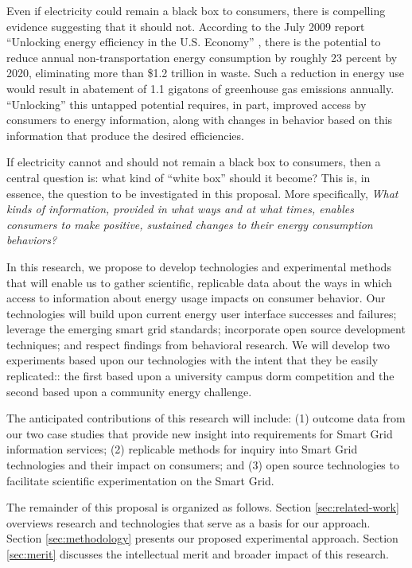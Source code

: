 Even if electricity could remain a black box to consumers, there is
compelling evidence suggesting that it should not.  According to the July 2009
report ``Unlocking energy efficiency in the U.S. Economy'' \cite{Granade09}, there is the
potential to reduce annual non-transportation energy consumption by roughly
23 percent by 2020, eliminating more than \$1.2 trillion in waste.  Such a
reduction in energy use would result in abatement of 1.1 gigatons of
greenhouse gas emissions annually. ``Unlocking'' this untapped potential
requires, in part, improved access by consumers to energy information,
along with changes in behavior based on this information that produce the
desired efficiencies.

If electricity cannot and should not remain a black box to consumers, then a
central question is: what kind of ``white box'' should it become? This is,
in essence, the question to be investigated in this proposal.  More specifically, {\em
  What kinds of information, provided in what ways and at what times,
  enables consumers to make positive, sustained changes to their energy
  consumption behaviors?}

In this research, we propose to develop technologies and experimental
methods that will enable us to gather scientific, replicable data about the
ways in which access to information about energy usage impacts on consumer
behavior.  Our technologies will build upon current energy user interface
successes and failures; leverage the emerging smart grid standards;
incorporate open source development techniques; and respect findings from
behavioral research. We will develop two experiments based upon our
technologies with the intent that they be easily replicated:: the first
based upon a university campus dorm competition and the second based upon a
community energy challenge.

The anticipated contributions of this research will include: (1) outcome
data from our two case studies that provide new insight into requirements
for Smart Grid information services; (2) replicable methods for inquiry
into Smart Grid technologies and their impact on consumers; and (3) open
source technologies to facilitate scientific experimentation on the Smart
Grid.

The remainder of this proposal is organized as follows.  Section
\ref{sec:related-work} overviews research and technologies that serve as a
basis for our approach.  Section \ref{sec:methodology} presents our proposed
experimental approach.  Section \ref{sec:merit} discusses the intellectual
merit and broader impact of this research. 



